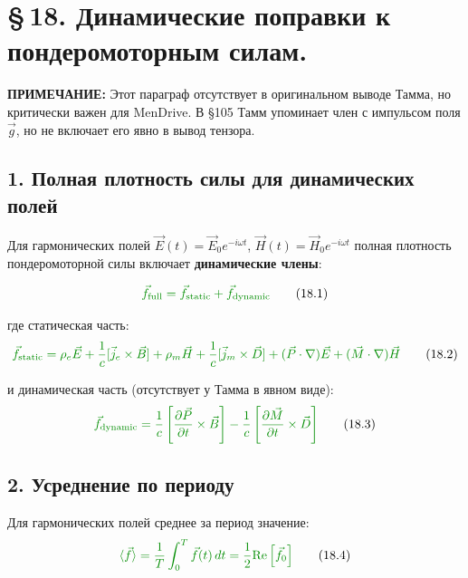 \documentclass[a4paper,12pt]{article}
\newcommand{\modtext}[1]{\textcolor{modcolor}{#1}}
\newcommand{\modmath}[1]{\textcolor{modcolor}{#1}}
\newcommand{\modblock}[1]{\colorbox{modcolor!10}{\parbox{\dimexpr\linewidth-2\fboxsep}{#1}}}
\begin{document}
\section*{\S\,18. Динамические поправки к пондеромоторным силам.}

\modtext{
    \textbf{ПРИМЕЧАНИЕ:} Этот параграф отсутствует в оригинальном выводе Тамма,
    но критически важен для MenDrive. В §105 Тамм упоминает член с импульсом
    поля $\vec{g}$, но не включает его явно в вывод тензора.
}

\subsection*{1. Полная плотность силы для динамических полей}



    Для гармонических полей $\vec{E}(t) = \vec{E}_0 e^{-i\omega t}$,
    $\vec{H}(t) = \vec{H}_0 e^{-i\omega t}$ полная плотность пондеромоторной
    силы включает \textbf{динамические члены}:

    \begin{equation}
    \modmath{
        \vec{f}_{\text{full}} = \vec{f}_{\text{static}} + \vec{f}_{\text{dynamic}}
    }
    \tag{18.1}
    \end{equation}

    где статическая часть:
    \begin{equation}
    \modmath{
        \vec{f}_{\text{static}} = \rho_e\vec{E} + \frac{1}{c}[\vec{j}_e\times\vec{B}] +
        \rho_m\vec{H} + \frac{1}{c}[\vec{j}_m\times\vec{D}] +
        (\vec{P}\cdot\nabla)\vec{E} + (\vec{M}\cdot\nabla)\vec{H}
    }
    \tag{18.2}
    \end{equation}

    и динамическая часть (отсутствует у Тамма в явном виде):
    \begin{equation}
    \modmath{
        \vec{f}_{\text{dynamic}} = \frac{1}{c}\left[\frac{\partial\vec{P}}{\partial t}\times\vec{B}\right] -
        \frac{1}{c}\left[\frac{\partial\vec{M}}{\partial t}\times\vec{D}\right]
    }
    \tag{18.3}
    \end{equation}

    \subsection*{2. Усреднение по периоду}

    Для гармонических полей среднее за период значение:
    \begin{equation}
    \modmath{
        \langle\vec{f}\rangle = \frac{1}{T}\int_0^T \vec{f}(t)\,dt =
        \frac{1}{2}\text{Re}\left[\vec{f}_0\right]
    }
    \tag{18.4}
    \end{equation}
\end{document}
